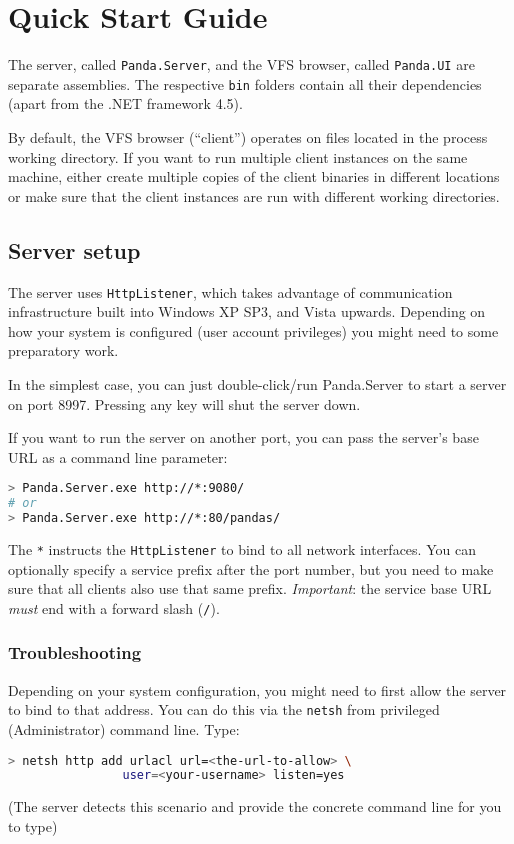 \documentclass[a4paper,12pt]{article}
\begin{document}

\section{Quick Start Guide}
The server, called \lstinline!Panda.Server!, and the VFS browser, called \lstinline!Panda.UI! are separate assemblies. The respective \lstinline!bin! folders contain all their dependencies (apart from the .NET framework 4.5).

By default, the VFS browser (``client'') operates on files located in the process working directory. If you want to run multiple client instances on the same machine, either create multiple copies of the client binaries in different locations or make sure that the client instances are run with different working directories.

\subsection{Server setup}
The server uses \lstinline!HttpListener!, which takes advantage of communication infrastructure built into Windows XP SP3, and Vista upwards. 
Depending on how your system is configured (user account privileges) you might need to some preparatory work.

In the simplest case, you can just double-click/run Panda.Server to start a server on port 8997. 
Pressing any key will shut the server down.

If you want to run the server on another port, you can pass the server's base URL as a command line parameter:

\begin{lstlisting}[language=bash]
> Panda.Server.exe http://*:9080/
# or
> Panda.Server.exe http://*:80/pandas/
\end{lstlisting}

The \lstinline!*! instructs the \lstinline!HttpListener! to bind to all network interfaces. 
You can optionally specify a service prefix after the port number, but you need to make sure that all clients also use that same prefix.
\emph{Important}: the service base URL \emph{must} end with a forward slash (\lstinline!/!).

\subsubsection{Troubleshooting}
Depending on your system configuration, you might need to first allow the server to bind to that address.
You can do this via the \lstinline[language=bash]!netsh! from privileged (Administrator) command line.
Type:
\begin{lstlisting}[language=bash]
> netsh http add urlacl url=<the-url-to-allow> \ 
                user=<your-username> listen=yes
\end{lstlisting}
(The server detects this scenario and provide the concrete command line for you to type)
\end{document}
